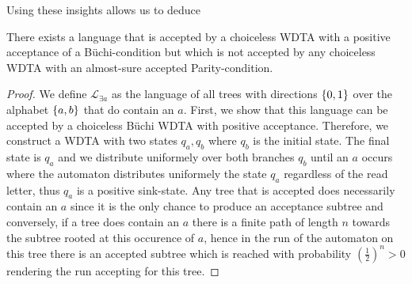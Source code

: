Using these insights allows us to deduce
\begin{proposition}
  There exists a language that is accepted by a choiceless \ac{WDTA} with a
  positive acceptance of a Büchi-condition but which is not accepted by any
  choiceless \ac{WDTA} with an almost-sure accepted Parity-condition.
\end{proposition}
\begin{proof}
  We define $\mathcal{L}_{\exists a}$ as the language of all trees with
  directions $\left\{0,1\right\}$ over the alphabet $\left\{a,b\right\}$ that do contain an $a$.
  First, we show that this language can be accepted by a choiceless Büchi
  \ac{WDTA} with positive acceptance. Therefore, we construct a \ac{WDTA} with 
  two states $q_{a}, q_{b}$ where $q_{b}$ is the initial state. The final state 
  is $q_{a}$ and we distribute uniformely over both branches $q_{b}$ until an 
  $a$ occurs where the automaton distributes uniformely the state $q_{a}$ 
  regardless of the read letter, thus $q_{a}$ is a positive sink-state. Any 
  tree that is accepted does necessarily contain an $a$ since it is the only 
  chance to produce an acceptance subtree and conversely, if a tree does 
  contain an $a$ there is a finite path of length $n$ towards the subtree 
  rooted at this occurence of $a$, hence in the run of the automaton on this 
  tree there is an accepted subtree which is reached with probability 
  $(\frac{1}{2})^{n} > 0$ rendering the run accepting for this tree.


\end{proof}
